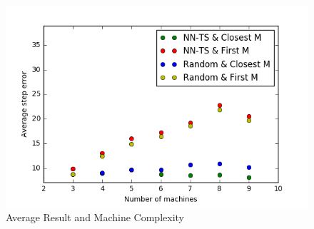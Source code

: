 \begin{figure}[!hbt]
  \includegraphics[width=1.1\textwidth]{img/avg_error_vs_machines}
  \caption{Average Result and Machine Complexity}
  \label{fig:abc4}
\end{figure}

